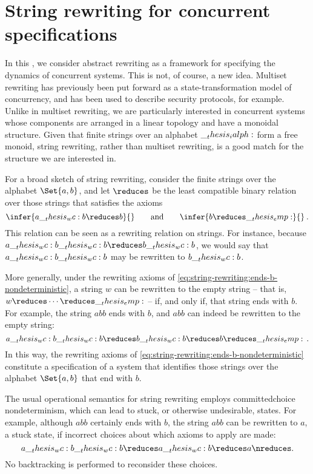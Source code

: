 \chapter{String rewriting for concurrent specifications}\label{ch:string-rewriting}

In this , we consider abstract rewriting as a framework for specifying the dynamics of concurrent systems.
This is not, of course, a new idea.
Multiset rewriting\autocites{Meseguer:TCS92}{Cervesato+Scedrov:IC09} has previously been put forward as a state-transformation model of concurrency, and has been used to describe security protocols\autocites{Cervesato+:CSFW99}{Durgin+:JCS04}, for example.
Unlike in multiset rewriting, we are particularly interested in concurrent systems whose components are arranged in a linear topology and have a monoidal structure.
Given that finite strings over an alphabet $\__thesis_ialph:$ form a free monoid, string rewriting, rather than multiset rewriting, is a good match for the structure we are interested in.

For a broad sketch of string rewriting, consider the finite strings over the alphabet $\Set{a,b}$, and let $\reduces$ be the least compatible binary relation over those strings that satisfies the axioms
\begin{equation}\label{eq:string-rewriting:ends-b-nondeterministic}
  \infer{a \wc b \reduces b}{}
  \qquad\text{and}\qquad
  \infer{b \reduces \emp}{}
  \:.
\end{equation}
This relation can be seen as a rewriting relation on strings.
For instance, because $a \wc b \wc b \reduces b \wc b$, we would say that $a \wc b \wc b$ may be rewritten to $b \wc b$.

More generally, under the rewriting axioms of \cref{eq:string-rewriting:ends-b-nondeterministic}, a string $w$ can be rewritten to the empty string -- that is, $w \reduces \dotsb \reduces \emp$ -- if, and only if, that string ends with $b$.
For example, the string $abb$ ends with $b$, and $abb$ can indeed be rewritten to the empty string:
\begin{equation*}
  a \wc b \wc b
    \reduces b \wc b
    \reduces b
    \reduces \emp
  \,.
\end{equation*}
In this way, the rewriting axioms of \cref{eq:string-rewriting:ends-b-nondeterministic} constitute a specification of a system that identifies those strings over the alphabet $\Set{a,b}$ that end with $b$.

The usual operational semantics for string rewriting employs committed\-choice nondeterminism, which
can lead to stuck, or otherwise undesirable, states.
For example, although $abb$ certainly ends with $b$, the string $abb$ can be rewritten to $a$, a stuck state, if incorrect choices about which axioms to apply are made:
\begin{equation*}
  a \wc b \wc b \reduces a \wc b \reduces a \nreduces
  \,\!.
\end{equation*}
No backtracking is performed to reconsider these choices.

